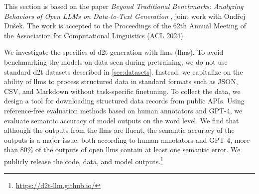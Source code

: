 \begin{refbox}
    This section is based on the paper \emph{Beyond Traditional Benchmarks: Analyzing Behaviors of Open LLMs on Data-to-Text Generation} \cite{kasnerReferenceBasedMetricsAnalyzing2024}, joint work with Ondřej Dušek. The work is accepted to the Proceedings of the 62th Annual Meeting of the Association for Computational Linguistics (ACL 2024).
\end{refbox}
We investigate the specifics of \ac{d2t} generation with \aclp{llm} (\acsp{llm}). To avoid benchmarking the models on data seen during pretraining, we do not use standard \ac{d2t} datasets described in \autoref{sec:datasets}. Instead, we capitalize on the ability of \acp{llm} to process structured data in standard formats such as JSON, CSV, and Markdown without task-specific finetuning. To collect the data, we design a tool for downloading structured data records from public APIs.
Using reference-free evaluation methods based on human annotators and GPT-4, we evaluate semantic accuracy of model outputs on the word level.
We find that although the outputs from the \acp{llm} are fluent, the semantic accuracy of the outputs is a major issue: both according to human annotators and GPT-4, more than 80\% of the outputs of open \acp{llm} contain at least one semantic error. We publicly release the code, data, and model outputs.\footnote{\url{https://d2t-llm.github.io/}}


